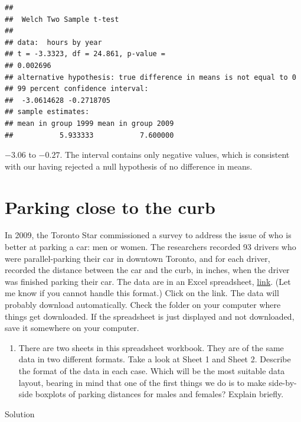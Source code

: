 \documentclass[]{tufte-book}
\providecommand{\tightlist}{%
  \setlength{\itemsep}{0pt}\setlength{\parskip}{0pt}}
\theoremstyle{definition}
\theoremstyle{definition}
\theoremstyle{definition}
\theoremstyle{remark}
\begin{document}
\begin{verbatim}
## 
##  Welch Two Sample t-test
## 
## data:  hours by year
## t = -3.3323, df = 24.861, p-value =
## 0.002696
## alternative hypothesis: true difference in means is not equal to 0
## 99 percent confidence interval:
##  -3.0614628 -0.2718705
## sample estimates:
## mean in group 1999 mean in group 2009 
##           5.933333           7.600000
\end{verbatim}

\(-3.06\) to \(-0.27\). The interval contains only negative values,
which is consistent with our having rejected a null hypothesis of no
difference in means.

\hypertarget{parking-close-to-the-curb}{%
\section{Parking close to the curb}\label{parking-close-to-the-curb}}

In 2009, the Toronto Star commissioned a survey to address the issue of
who is better at parking a car: men or women. The researchers recorded
93 drivers who were parallel-parking their car in downtown Toronto, and
for each driver, recorded the distance between the car and the curb, in
inches, when the driver was finished parking their car. The data are in
an Excel spreadsheet,
\href{http://www.utsc.utoronto.ca/~butler/c32/parking.xlsx}{link}. (Let
me know if you cannot handle this format.) Click on the link. The data
will probably download automatically. Check the folder on your computer
where things get downloaded.
 If the
spreadsheet is just displayed and not downloaded, save it somewhere on
your computer.

\begin{enumerate}
\def\labelenumi{(\alph{enumi})}
\tightlist
\item
  There are two sheets in this spreadsheet workbook. They are of the
  same data in two different formats. Take a look at Sheet 1 and Sheet
  2. Describe the format of the data in each case. Which will be the
  most suitable data layout, bearing in mind that one of the first
  things we do is to make side-by-side boxplots of parking distances for
  males and females? Explain briefly.
\end{enumerate}

Solution
\end{document}
